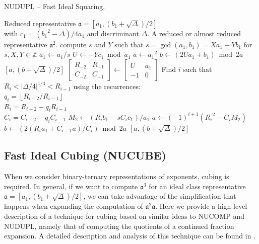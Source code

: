 \documentclass{ucalgthes1}
\theoremstyle{definition}
\newcommand{\ZZ}{\mathbb{Z}}
\newcommand{\matrixtt}[4]{\left[ \begin{array}{rr} #1 & #2 \\ #3 & #4 \end{array} \right]}
\newcommand{\floor}[1]{\left\lfloor #1 \right\rfloor}
\begin{document}
\begin{algorithm}[h]
\caption{NUDUPL -- Fast Ideal Squaring.}
\label{alg:nudupl}
\begin{algorithmic}[1]
\REQUIRE Reduced representative $\mathfrak a = [a_1, (b_1+\sqrt\Delta)/2]$ \\
         with $c_1 = ({b_1}^2-\Delta)/4a_1$ and discriminant $\Delta$.
\ENSURE A reduced or almost reduced representative $\mathfrak a^2$.
\STATE compute $s$ and $Y$ such that $s = \gcd(a_1, b_1) = Xa_1 + Yb_1$ for $s,X,Y \in \ZZ$
\STATE $a_1 \gets a_1/s$
\STATE $U \gets -Yc_1 \bmod a_1$
	\STATE $a \gets {a_1}^2$
	\STATE $b \gets (2Ua_1 + b_1) \bmod 2a$
	\RETURN $[a, (b + \sqrt\Delta)/2]$
\ENDIF
\STATE $\matrixtt{R_{-2}}{R_{-1}}{C_{-2}}{C_{-1}} \gets \matrixtt{U}{a_1}{-1}{0}$
\STATE Find $i$ such that $R_i < |\Delta/4|^{1/4} < R_{i-1}$ using the recurrences: \\
       $q_i = \floor{R_{i-2}/R_{i-1}}$ \\
       $R_i = R_{i-2}-q_i R_{i-1}$ \\
       $C_i=C_{i-2}-q_i C_{i-1}$
\STATE $M_2 \gets (R_i b_1 -sC_i c_1)/a_1$
\STATE $a \gets (-1)^{i+1}({R_i}^2 - C_i M_2)$
\STATE $b \gets (2(R_i a_1 + C_{i-1} a)/C_i) \bmod{2a}$
\RETURN $[a, (b+\sqrt\Delta)/2]$
\end{algorithmic}
\end{algorithm}

\subsection{Fast Ideal Cubing (NUCUBE)}
\label{subsec:nucube}

When we consider binary-ternary representations of exponents, cubing is required.  In general, if we want to compute ${\mathfrak a}^3$ for an ideal class representative $\mathfrak a = [a_1, (b_1+\sqrt\Delta)/2]$, we can take advantage of the simplification that happens when expanding the computation of ${\mathfrak a}^2 \mathfrak a$.  Here we provide a high level description of a technique for cubing based on similar ideas to NUCOMP and NUDUPL, namely that of computing the quotients of a continued fraction expansion.  A detailed description and analysis of this technique can be found in \cite{Imbert2010}.
\end{document}
